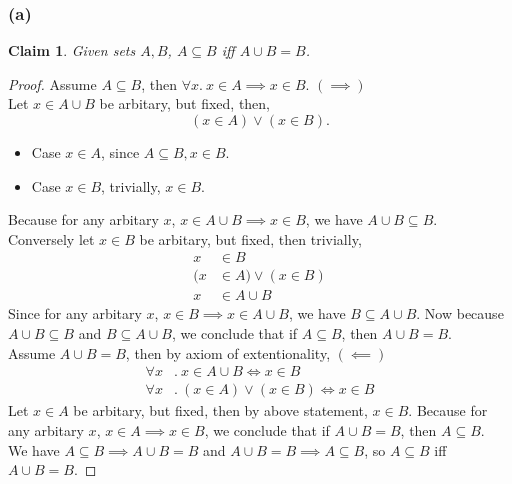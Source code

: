 \documentclass[12pt]{article}
\newtheorem*{claim}{Claim}
\begin{document}
\subsubsection*{(a)}
\begin{claim}
    Given sets $A, B$, $A \subseteq B$ iff $A \cup B = B$.
\end{claim}
\begin{proof}
    Assume $A \subseteq B$, then $\forall x.~ x \in A \implies x \in B.$
        \hfill$(\implies)$\\
    Let $x \in A \cup B$ be arbitary, but fixed, then,
        $$(x \in A) \lor (x \in B).$$
        \begin{itemize}[label={}]
            \item Case $x \in A$, since $A \subseteq B, x \in B.$
            \item Case $x \in B$, trivially, $x \in B$.
        \end{itemize}
    Because for any arbitary $x$,
        $x \in A \cup B \implies x \in B$, we have $A \cup B \subseteq B$.\\
    Conversely let $x \in B$ be arbitary, but fixed, then trivially,
    \begin{align*}
        x &\in B\\
        (x &\in A) \lor (x \in B)\\
        x &\in A \cup B
    \end{align*}
    Since for any arbitary $x$,
        $x \in B \implies x \in A \cup B$, we have $B \subseteq A \cup B$.
    Now because $A \cup B \subseteq B$ and $B \subseteq A \cup B$, we conclude that
        if $A \subseteq B$, then $A \cup B = B$.\\
    Assume $A \cup B = B$, then by axiom of extentionality,
        \hfill$(\impliedby)$
        \begin{align*}
            \forall x&.~ x \in A \cup B \iff x \in B\\
            \forall x&.~ (x \in A) \lor (x \in B) \iff x \in B
        \end{align*}
    Let $x \in A$ be arbitary, but fixed, then by above statement, $x \in B.$
    Because for any arbitary $x$, $x \in A \implies x \in B$, we conclude that
        if $A \cup B = B$, then $A \subseteq B$.\\
    We have $A \subseteq B \implies A \cup B = B$ and $A \cup B = B \implies A \subseteq B$,
    so $A \subseteq B$ iff $A \cup B = B$.
\end{proof}
\newpage
\end{document}
